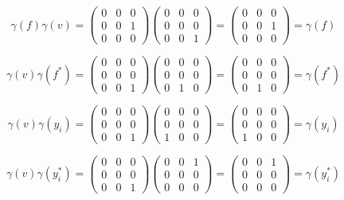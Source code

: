 \begin{solution}
    $$\gamma(f)\gamma(v)=\left(\begin{array}{ccc} 0 & 0 & 0 \\ 0 & 0 & 1 \\ 0 & 0 & 0 \end{array}\right)
    \left(\begin{array}{ccc} 0 & 0 & 0 \\ 0 & 0 & 0 \\ 0 & 0 & 1 \end{array}\right)
    =\left(\begin{array}{ccc} 0 & 0 & 0 \\ 0 & 0 & 1 \\ 0 & 0 & 0 \end{array}\right)=\gamma(f)$$

    $$\gamma(v)\gamma(f^*)=\left(\begin{array}{ccc} 0 & 0 & 0 \\ 0 & 0 & 0 \\ 0 & 0 & 1 \end{array}\right)
    \left(\begin{array}{ccc} 0 & 0 & 0 \\ 0 & 0 & 0 \\ 0 & 1 & 0 \end{array}\right)
    =\left(\begin{array}{ccc} 0 & 0 & 0 \\ 0 & 0 & 0 \\ 0 & 1 & 0 \end{array}\right)=\gamma(f^*)$$

    $$\gamma(v)\gamma(y_i)=\left(\begin{array}{ccc} 0 & 0 & 0 \\ 0 & 0 & 0 \\ 0 & 0 & 1 \end{array}\right)
    \left(\begin{array}{ccc} 0 & 0 & 0 \\ 0 & 0 & 0 \\ 1 & 0 & 0 \end{array}\right)
    =\left(\begin{array}{ccc} 0 & 0 & 0 \\ 0 & 0 & 0 \\ 1 & 0 & 0 \end{array}\right)=\gamma(y_i)$$

    $$\gamma(v)\gamma(y_i^*)=\left(\begin{array}{ccc} 0 & 0 & 0 \\ 0 & 0 & 0 \\ 0 & 0 & 1 \end{array}\right)
    \left(\begin{array}{ccc} 0 & 0 & 1 \\ 0 & 0 & 0 \\ 0 & 0 & 0 \end{array}\right)
    =\left(\begin{array}{ccc} 0 & 0 & 1 \\ 0 & 0 & 0 \\ 0 & 0 & 0 \end{array}\right)=\gamma(y_i^*)$$


\end{solution}
